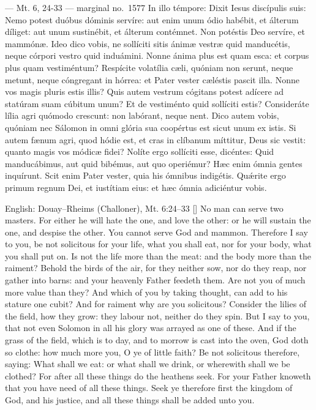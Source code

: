 \begin{appointedlatin}{ --- Mt. 6, 24-33 --- marginal no.\ 1577}
In illo témpore: Dixit Iesus discípulis suis: Nemo potest duóbus dóminis
servíre: aut enim unum ódio habébit, et álterum díliget: aut unum sustinébit,
et álterum contémnet. Non potéstis Deo servíre, et mammónæ. Ideo dico vobis,
ne sollíciti sitis ánimæ vestræ quid manducétis, neque córpori vestro quid
induámini. Nonne ánima plus est quam esca: et corpus plus quam vestiméntum?
Respícite volatília cæli, quóniam non serunt, neque metunt, neque cóngregant
in hórrea: et Pater vester cæléstis pascit illa. Nonne vos magis pluris estis
illis? Quis autem vestrum cógitans potest adícere ad statúram suam cúbitum
unum? Et de vestiménto quid sollíciti estis? Consideráte lília agri quómodo
crescunt: non labórant, neque nent. Dico autem vobis, quóniam nec Sálomon in
omni glória sua coopértus est sicut unum ex istis. Si autem fænum agri, quod
hódie est, et cras in clíbanum míttitur, Deus sic vestit: quanto magis vos
módicæ fidei? Nolíte ergo sollíciti esse, dicéntes: Quid manducábimus, aut
quid bibémus, aut quo operiémur? Hæc enim ómnia gentes inquírunt. Scit enim
Pater vester, quia his ómnibus indigétis. Quǽrite ergo primum regnum Dei, et
iustítiam eius: et hæc ómnia adiciéntur vobis.
\end{appointedlatin}

\begin{namedtranslation}{English: Douay--Rheims (Challoner), Mt. 6:24--33}
[] No man can serve two
masters. For either he will hate the one, and love the other: or he will
sustain the one, and despise the other. You cannot serve God and mammon.
Therefore I say to you, be not solicitous for your life, what you shall eat,
nor for your body, what you shall put on. Is not the life more than the meat:
and the body more than the raiment? Behold the birds of the air, for they
neither sow, nor do they reap, nor gather into barns: and your heavenly Father
feedeth them. Are not you of much more value than they? And which of you by
taking thought, can add to his stature one cubit? And for raiment why are you
solicitous? Consider the lilies of the field, how they grow: they labour not,
neither do they spin. But I say to you, that not even Solomon in all his glory
was arrayed as one of these. And if the grass of the field, which is to day,
and to morrow is cast into the oven, God doth so clothe: how much more you, O
ye of little faith? Be not solicitous therefore, saying: What shall we eat: or
what shall we drink, or wherewith shall we be clothed? For after all these
things do the heathens seek. For your Father knoweth that you have need of all
these things. Seek ye therefore first the kingdom of God, and his justice, and
all these things shall be added unto you.
\end{namedtranslation}

